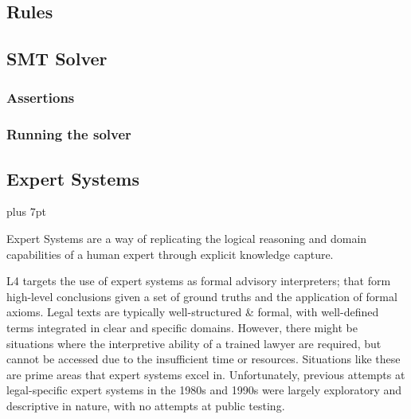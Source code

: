 


\subsection{Rules}\label{sec:rules}


\subsection{SMT Solver}\label{sec:smt_solver}


\subsubsection{Assertions}\label{sec:assertions}


\subsubsection{Running the solver}\label{sec:running_solver}



\subsection{Expert Systems}\label{sec:epert_systems}
\parskip=5pt plus 7pt
\parindent=15pt

Expert Systems are a way of replicating the logical reasoning and domain 
capabilities of a human expert through explicit knowledge capture.

L4 targets the use of expert systems as formal advisory interpreters; that form 
high-level conclusions given a set of ground truths and the application of formal 
axioms. 
Legal texts are typically well-structured \& formal, with well-defined 
terms integrated in clear and specific domains. However, there might be 
situations where the interpretive ability of a trained lawyer are required, 
but cannot be accessed due to the insufficient time or resources. Situations like
these are prime areas that expert systems excel in. Unfortunately,  
previous attempts at legal-specific expert systems in the 1980s and 1990s were 
largely exploratory and descriptive in nature, with no attempts at public testing. \cite{leith2016riseandfall}


